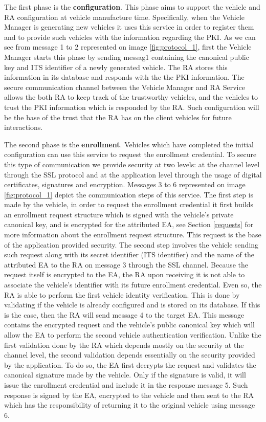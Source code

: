 The first phase is the \textbf{configuration}. This phase aims to support the vehicle and RA configuration at vehicle manufacture time. Specifically, when the Vehicle Manager is generating new vehicles it uses this service in order to register them and to provide such vehicles with the information regarding the PKI. As we can see from message 1 to 2 represented on image \ref{fig:protocol_1}, first the Vehicle Manager starts this phase by sending messag1 containing the canonical public key and ITS identifier of a newly generated vehicle. The RA stores this information in its database and responds with the the PKI information. The secure communication channel between the Vehicle Manager and RA Service allows the both RA to keep track of the trustworthy vehicles, and the vehicles to trust the PKI information which is responded by the RA. Such configuration will be the base of the trust that the RA has on the client vehicles for future interactions. 


The second phase is the \textbf{enrollment}. Vehicles which have completed the initial configuration can use this service to request the enrollment credential. To secure this type of communication we provide security at two levels: at the channel level through the SSL protocol and at the application level through the usage of digital certificates, signatures and encryption. Messages 3 to 6 represented on image \ref{fig:protocol_1} depict the communication steps of this service. The first step is made by the vehicle, in order to request the enrollment credential it first builds an enrollment request structure which is signed with the vehicle's private canonical key, and is encrypted for the attributed EA, see Section \ref{requests} for more information about the enrollment request structure. This request is the base of the application provided security. The second step involves the vehicle sending such request along with its secret identifier (ITS identifier) and the name of the attributed EA to the RA on message 3 through the SSL channel. Because the request itself is encrypted to the EA, the RA upon receiving it is not able to associate the vehicle's identifier with its future enrollment credential. Even so, the RA is able to perform the first vehicle identity verification. This is done by validating if the vehicle is already configured and is stored on its database. If this is the case, then the RA will send message 4 to the target EA. This message contains the encrypted request and the vehicle's public canonical key which will allow the EA to perform the second vehicle authentication verification. Unlike the first validation done by the RA which depends mostly on the security at the channel level, the second validation depends essentially on the security provided by the application. To do so, the EA first decrypts the request and validates the canonical signature made by the vehicle. Only if the signature is valid, it will issue the enrollment credential and include it in the response message 5. Such response is signed by the EA, encrypted to the vehicle and then sent to the RA which has the responsibility of returning it to the original vehicle using message 6.

